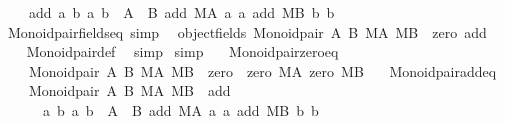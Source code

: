 \begin{isabellebody}
\ \ \ \ {\isasymlangle}{\isacharat}{\kern0pt}add{\isacharcomma}{\kern0pt}\ {\isasymlambda}{\isasymlangle}a{}{\isacharcomma}{\kern0pt}\ b{}{\isasymrangle}\ {\isasymlangle}a{}{\isacharcomma}{\kern0pt}\ b{}{\isasymrangle}\ {\isasymin}\ A\ {\isasymtimes}\ B{\isachardot}{\kern0pt}\ {\isasymlangle}add\ MA\ a{}\ a{}{\isacharcomma}{\kern0pt}\ add\ MB\ b{}\ b{}{\isasymrangle}{\isasymrangle}\isanewline
\ \ {\isacharbraceright}{\kern0pt}{\isachardoublequoteclose}\isanewline
\isanewline
{}\isamarkupfalse%
\ Monoid{\isacharunderscore}{\kern0pt}pair{\isacharunderscore}{\kern0pt}fields{\isacharunderscore}{\kern0pt}eq\ {\isacharbrackleft}{\kern0pt}simp{\isacharbrackright}{\kern0pt}{\isacharcolon}{\kern0pt}\isanewline
\ \ {\isachardoublequoteopen}object{\isacharunderscore}{\kern0pt}fields\ {\isacharparenleft}{\kern0pt}Monoid{\isacharunderscore}{\kern0pt}pair\ A\ B\ MA\ MB{\isacharparenright}{\kern0pt}\ {\isacharequal}{\kern0pt}\ {\isacharbraceleft}{\kern0pt}{\isacharat}{\kern0pt}zero{\isacharcomma}{\kern0pt}\ {\isacharat}{\kern0pt}add{\isacharbraceright}{\kern0pt}{\isachardoublequoteclose}\isanewline
%
\isadelimproof
\ \ %
\endisadelimproof
%
\isatagproof
{}\isamarkupfalse%
\ Monoid{\isacharunderscore}{\kern0pt}pair{\isacharunderscore}{\kern0pt}def\ \isamarkupfalse%
\ simp%
\endisatagproof
{\isafoldproof}%
%
\isadelimproof
\isanewline
%
\endisadelimproof
\isanewline
{}\isamarkupfalse%
\ {\isacharbrackleft}{\kern0pt}simp{\isacharbrackright}{\kern0pt}{\isacharcolon}{\kern0pt}\isanewline
\ \ \ Monoid{\isacharunderscore}{\kern0pt}pair{\isacharunderscore}{\kern0pt}zero{\isacharunderscore}{\kern0pt}eq{\isacharcolon}{\kern0pt}\isanewline
\ \ \ \ {\isachardoublequoteopen}{\isacharparenleft}{\kern0pt}Monoid{\isacharunderscore}{\kern0pt}pair\ A\ B\ MA\ MB{\isacharparenright}{\kern0pt}\ {\isacharat}{\kern0pt}{\isacharat}{\kern0pt}\ zero\ {\isacharequal}{\kern0pt}\ {\isasymlangle}zero\ MA{\isacharcomma}{\kern0pt}\ zero\ MB{\isasymrangle}{\isachardoublequoteclose}\isanewline
\ \ \ Monoid{\isacharunderscore}{\kern0pt}pair{\isacharunderscore}{\kern0pt}add{\isacharunderscore}{\kern0pt}eq{\isacharcolon}{\kern0pt}\isanewline
\ \ \ \ {\isachardoublequoteopen}{\isacharparenleft}{\kern0pt}Monoid{\isacharunderscore}{\kern0pt}pair\ A\ B\ MA\ MB{\isacharparenright}{\kern0pt}\ {\isacharat}{\kern0pt}{\isacharat}{\kern0pt}\ add\ {\isacharequal}{\kern0pt}\isanewline
\ \ \ \ \ \ {\isasymlambda}{\isasymlangle}a{}{\isacharcomma}{\kern0pt}\ b{}{\isasymrangle}\ {\isasymlangle}a{}{\isacharcomma}{\kern0pt}\ b{}{\isasymrangle}\ {\isasymin}\ A\ {\isasymtimes}\ B{\isachardot}{\kern0pt}\ {\isasymlangle}add\ MA\ a{}\ a{}{\isacharcomma}{\kern0pt}\ add\ MB\ b{}\ b{}{\isasymrangle}{\isachardoublequoteclose}\isanewline

\end{isabellebody}

